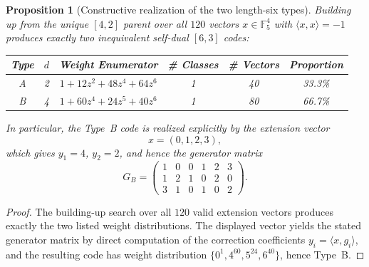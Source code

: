 \documentclass[12pt]{article}
\newtheorem{prop}[theorem]{Proposition}
\newcommand{\F}{\mathbb{F}}
\begin{document}
\begin{prop}[Constructive realization of the two length-six types]
\label{prop:constructive-63}
Building up from the unique $[4,2]$ parent over all $120$ vectors $x \in \F_5^4$ with $\langle x,x\rangle=-1$ produces exactly two inequivalent self-dual $[6,3]$ codes:
\begin{center}
\begin{tabular}{cccccc}
\toprule
Type & $d$ & Weight Enumerator & \# Classes & \# Vectors & Proportion \\
\midrule
A & 2 & $1 + 12z^2 + 48z^4 + 64z^6$ & 1 & 40 & 33.3\% \\
B & 4 & $1 + 60z^4 + 24z^5 + 40z^6$ & 1 & 80 & 66.7\% \\
\bottomrule
\end{tabular}
\end{center}
In particular, the Type~B code is realized explicitly by the extension vector
\[
x = (0,1,2,3),
\]
which gives $y_1 = 4$, $y_2 = 2$, and hence the generator matrix
\[
G_B =
\begin{pmatrix}
1 & 0 & 0 & 1 & 2 & 3 \\
1 & 2 & 1 & 0 & 2 & 0 \\
3 & 1 & 0 & 1 & 0 & 2
\end{pmatrix}.
\]
\end{prop}

\begin{proof}
The building-up search over all $120$ valid extension vectors produces exactly the two listed weight distributions. The displayed vector yields the stated generator matrix by direct computation of the correction coefficients $y_i = \langle x,g_i\rangle$, and the resulting code has weight distribution $\{0^1,4^{60},5^{24},6^{40}\}$, hence Type~B.
\end{proof}
\end{document}
